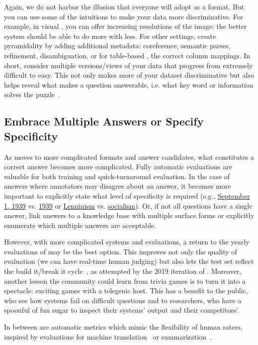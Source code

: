 Again, we do not harbor the illusion that everyone will adopt \qb{} as a format.
But you can use some of the intuitions to make your data more discriminative.
For example, in visual , you can offer increasing resolutions of the image: the better system should be able to do more with less.
For other settings, create pyramidality by adding additional metadata: coreference, semantic parses, refinement, disambiguation, or for table-based , the correct column mappings.
In short, consider multiple versions/views of your data that progress from extremely difficult to easy.
This not only makes more of your dataset discriminative but also helps reveal what makes a question answerable, i.e. what key word or information solves the puzzle~\cite[Chapter 10]{klagge-10}.

\subsection{Embrace Multiple Answers or Specify Specificity}

As \qa{} moves to more complicated formats and answer candidates, what constitutes a correct answer becomes more complicated.
Fully automatic evaluations are valuable for both training and quick-turnaround evaluation.
In the case of answers where annotators may disagree about an answer, it becomes more important to explicitly state what level of specificity is required (e.g., \underline{September 1, 1939} vs. \underline{1939} or \underline{Lenninism} vs. \underline{socialism}).
Or, if not all questions have a single answer, link answers to a knowledge base with multiple surface forms or explicitly enumerate which multiple answers are acceptable.

However, with more complicated systems and evaluations, a return to the yearly evaluations of  may be the best option.
This improves not only the quality of evaluation (we can have real-time human judging) but also lets the test set reflect the build it/break it cycle~\cite{ruef-16}, as attempted by the 2019 iteration of .
Moreover, another lesson the  community could learn from trivia games is to turn it into a spectacle: exciting games with a telegenic host.
This has a benefit to the public, who see how  systems fail on difficult questions and to  researchers, who have a spoonful of fun sugar to inspect their systems' output and their competitors'.

In between are automatic metrics which mimic the flexibility of human raters, inspired by evaluations for machine translation~\cite{papineni-02,specia-10} or summarization~\cite{lin-04}.

